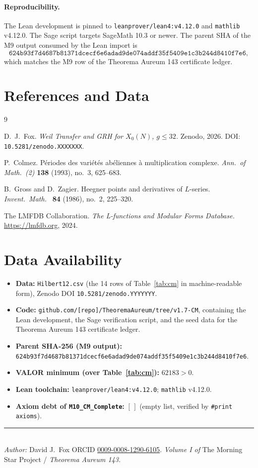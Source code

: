 \documentclass[11pt]{article}
\begin{document}
\paragraph{Reproducibility.} The Lean development is pinned to
\texttt{leanprover/lean4:v4.12.0} and \texttt{mathlib} v4.12.0. The
Sage script targets SageMath 10.3 or newer. The parent SHA of the M9
output consumed by the Lean import is
\[
\texttt{624b93f7d4687b81371dcecf6e6adad9de074addf35f5409e1c3b244d8410f7e6},
\]
which matches the M9 row of the Theorema Aureum 143 certificate ledger.

\newpage

\section*{References and Data}

\begin{thebibliography}{9}

D.\ J.\ Fox.
\newblock \emph{Weil Transfer and GRH for $X_0(N)$, $g \le 32$.}
\newblock Zenodo, 2026.
\newblock DOI: \texttt{10.5281/zenodo.XXXXXXX}.

P.\ Colmez.
\newblock P\'eriodes des vari\'et\'es ab\'eliennes \`a multiplication
complexe.
\newblock \emph{Ann.\ of Math.\ (2)} \textbf{138} (1993), no.~3,
625--683.

B.\ Gross and D.\ Zagier.
\newblock Heegner points and derivatives of $L$-series.
\newblock \emph{Invent.\ Math.\ } \textbf{84} (1986), no.~2, 225--320.

The LMFDB Collaboration.
\newblock \emph{The L-functions and Modular Forms Database.}
\newblock \url{https://lmfdb.org}, 2024.

\end{thebibliography}

\section*{Data Availability}

\begin{itemize}
  \item \textbf{Data:} \texttt{Hilbert12.csv} (the 14 rows of
    Table~\ref{tab:cm} in machine-readable form), Zenodo
    DOI \texttt{10.5281/zenodo.YYYYYYY}.
  \item \textbf{Code:}
    \texttt{github.com/[repo]/TheoremaAureum/tree/v1.7-CM}, containing
    the Lean development, the Sage verification script, and the seed
    data for the Theorema Aureum 143 certificate ledger.
  \item \textbf{Parent SHA-256 (M9 output):} \\
    \texttt{624b93f7d4687b81371dcecf6e6adad9de074addf35f5409e1c3b244d8410f7e6}.
  \item \textbf{VALOR minimum (over Table~\ref{tab:cm}):} $62183 > 0$.
  \item \textbf{Lean toolchain:} \texttt{leanprover/lean4:v4.12.0};
    \texttt{mathlib} v4.12.0.
  \item \textbf{Axiom debt of \texttt{M10\_CM\_Complete}:} $[\,]$
    (empty list, verified by \texttt{\#print axioms}).
\end{itemize}

\bigskip
\noindent\rule{\linewidth}{0.4pt}\\
\small\textit{Author:} David J.\ Fox \quad ORCID
\href{https://orcid.org/0009-0008-1290-6105}{0009-0008-1290-6105}.\quad
\textit{Volume I of} The Morning Star Project / \textit{Theorema Aureum 143.}
\end{document}
